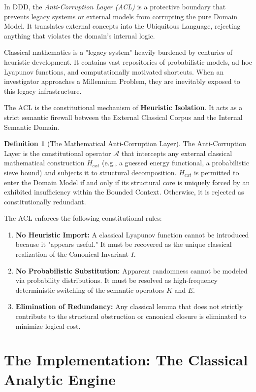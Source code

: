 \documentclass[12pt,openany]{extbook}
\theoremstyle{plain}
\theoremstyle{definition}
\newtheorem{definition}{Definition}[chapter]
\begin{document}
In DDD, the \emph{Anti-Corruption Layer (ACL)} is a protective boundary that prevents legacy systems or external models from corrupting the pure Domain Model. It translates external concepts into the Ubiquitous Language, rejecting anything that violates the domain's internal logic.

Classical mathematics is a "legacy system" heavily burdened by centuries of heuristic development. It contains vast repositories of probabilistic models, ad hoc Lyapunov functions, and computationally motivated shortcuts. When an investigator approaches a Millennium Problem, they are inevitably exposed to this legacy infrastructure. 

The ACL is the constitutional mechanism of \textbf{Heuristic Isolation}. It acts as a strict semantic firewall between the External Classical Corpus and the Internal Semantic Domain.

\begin{definition}[The Mathematical Anti-Corruption Layer]
The Anti-Corruption Layer is the constitutional operator $\mathcal{A}$ that intercepts any external classical mathematical construction $H_{ext}$ (e.g., a guessed energy functional, a probabilistic sieve bound) and subjects it to structural decomposition. $H_{ext}$ is permitted to enter the Domain Model if and only if its structural core is uniquely forced by an exhibited insufficiency within the Bounded Context. Otherwise, it is rejected as constitutionally redundant.
\end{definition}

The ACL enforces the following constitutional rules:
\begin{enumerate}
    \item \textbf{No Heuristic Import:} A classical Lyapunov function cannot be introduced because it "appears useful." It must be recovered as the unique classical realization of the Canonical Invariant $I$.
    \item \textbf{No Probabilistic Substitution:} Apparent randomness cannot be modeled via probability distributions. It must be resolved as high-frequency deterministic switching of the semantic operators $K$ and $E$.
    \item \textbf{Elimination of Redundancy:} Any classical lemma that does not strictly contribute to the structural obstruction or canonical closure is eliminated to minimize logical cost.
\end{enumerate}

\section{The Implementation: The Classical Analytic Engine}
\end{document}
